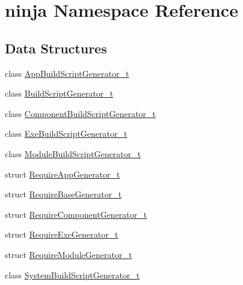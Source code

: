 \hypertarget{namespaceninja}{}\section{ninja Namespace Reference}
\label{namespaceninja}
\subsection*{Data Structures}
\begin{DoxyCompactItemize}
\item 
class \hyperlink{classninja_1_1_app_build_script_generator__t}{App\+Build\+Script\+Generator\+\_\+t}
\item 
class \hyperlink{classninja_1_1_build_script_generator__t}{Build\+Script\+Generator\+\_\+t}
\item 
class \hyperlink{classninja_1_1_component_build_script_generator__t}{Component\+Build\+Script\+Generator\+\_\+t}
\item 
class \hyperlink{classninja_1_1_exe_build_script_generator__t}{Exe\+Build\+Script\+Generator\+\_\+t}
\item 
class \hyperlink{classninja_1_1_module_build_script_generator__t}{Module\+Build\+Script\+Generator\+\_\+t}
\item 
struct \hyperlink{structninja_1_1_require_app_generator__t}{Require\+App\+Generator\+\_\+t}
\item 
struct \hyperlink{structninja_1_1_require_base_generator__t}{Require\+Base\+Generator\+\_\+t}
\item 
struct \hyperlink{structninja_1_1_require_component_generator__t}{Require\+Component\+Generator\+\_\+t}
\item 
struct \hyperlink{structninja_1_1_require_exe_generator__t}{Require\+Exe\+Generator\+\_\+t}
\item 
struct \hyperlink{structninja_1_1_require_module_generator__t}{Require\+Module\+Generator\+\_\+t}
\item 
class \hyperlink{classninja_1_1_system_build_script_generator__t}{System\+Build\+Script\+Generator\+\_\+t}
\end{DoxyCompactItemize}
